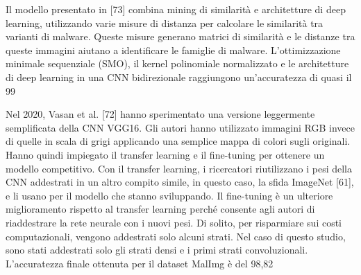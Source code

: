Il modello presentato in [73] combina mining di similarità e architetture di deep learning, utilizzando varie misure di distanza per calcolare le similarità tra varianti di malware. Queste misure generano matrici di similarità e le distanze tra queste immagini aiutano a identificare le famiglie di malware. L'ottimizzazione minimale sequenziale (SMO), il kernel polinomiale normalizzato e le architetture di deep learning in una CNN bidirezionale raggiungono un'accuratezza di quasi il 99%

Nel 2020, Vasan et al. [72] hanno sperimentato una versione leggermente semplificata della CNN VGG16. Gli autori hanno utilizzato immagini RGB invece di quelle in scala di grigi applicando una semplice mappa di colori sugli originali. Hanno quindi impiegato il transfer learning e il fine-tuning per ottenere un modello competitivo. Con il transfer learning, i ricercatori riutilizzano i pesi della CNN addestrati in un altro compito simile, in questo caso, la sfida ImageNet [61], e li usano per il modello che stanno sviluppando. Il fine-tuning è un ulteriore miglioramento rispetto al transfer learning perché consente agli autori di riaddestrare la rete neurale con i nuovi pesi. Di solito, per risparmiare sui costi computazionali, vengono addestrati solo alcuni strati. Nel caso di questo studio, sono stati addestrati solo gli strati densi e i primi strati convoluzionali. L'accuratezza finale ottenuta per il dataset MalImg è del 98,82%

